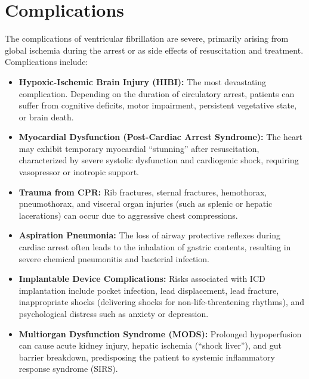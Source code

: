 \section*{Complications}
The complications of ventricular fibrillation are severe, primarily arising from global ischemia during the arrest or as side effects of resuscitation and treatment.
Complications include:
\begin{itemize}
    \item \textbf{Hypoxic-Ischemic Brain Injury (HIBI):} The most devastating complication. Depending on the duration of circulatory arrest, patients can suffer from cognitive deficits, motor impairment, persistent vegetative state, or brain death.
    \item \textbf{Myocardial Dysfunction (Post-Cardiac Arrest Syndrome):} The heart may exhibit temporary myocardial ``stunning'' after resuscitation, characterized by severe systolic dysfunction and cardiogenic shock, requiring vasopressor or inotropic support.
    \item \textbf{Trauma from CPR:} Rib fractures, sternal fractures, hemothorax, pneumothorax, and visceral organ injuries (such as splenic or hepatic lacerations) can occur due to aggressive chest compressions.
    \item \textbf{Aspiration Pneumonia:} The loss of airway protective reflexes during cardiac arrest often leads to the inhalation of gastric contents, resulting in severe chemical pneumonitis and bacterial infection.
    \item \textbf{Implantable Device Complications:} Risks associated with ICD implantation include pocket infection, lead displacement, lead fracture, inappropriate shocks (delivering shocks for non-life-threatening rhythms), and psychological distress such as anxiety or depression.
    \item \textbf{Multiorgan Dysfunction Syndrome (MODS):} Prolonged hypoperfusion can cause acute kidney injury, hepatic ischemia (``shock liver''), and gut barrier breakdown, predisposing the patient to systemic inflammatory response syndrome (SIRS).
\end{itemize}

